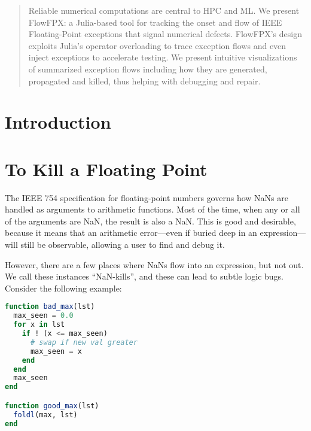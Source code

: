 \documentclass{juliacon}
\begin{document}

\maketitle

\begin{abstract}
  Reliable numerical computations are central to HPC and ML.
  We present FlowFPX: a Julia-based tool for tracking the onset and flow of IEEE Floating-Point exceptions that signal numerical defects.
  FlowFPX's design exploits Julia's operator overloading to trace exception flows and even inject exceptions to accelerate testing.
  We present intuitive visualizations of summarized exception flows including how they are generated, propagated and killed, thus helping with debugging and repair.
\end{abstract}

\section{Introduction}

\section{To Kill a Floating Point}


The IEEE 754 specification for floating-point numbers \cite{IEEEStandardBinary1985} governs how NaNs are handled as arguments to arithmetic functions.
Most of the time, when any or all of the arguments are NaN, the result is also a NaN.
This is good and desirable, because it means that an arithmetic error---even if buried deep in an expression---will still be observable, allowing a user to find and debug it.

However, there are a few places where NaNs flow into an expression, but not out.
We call these instances ``NaN-kills'', and these can lead to subtle logic bugs.
Consider the following example:

\begin{lstlisting}[language = Julia]
function bad_max(lst)
  max_seen = 0.0
  for x in lst
    if ! (x <= max_seen)
      # swap if new val greater
      max_seen = x
    end
  end
  max_seen
end

function good_max(lst)
  foldl(max, lst)
end
\end{lstlisting}
\end{document}
